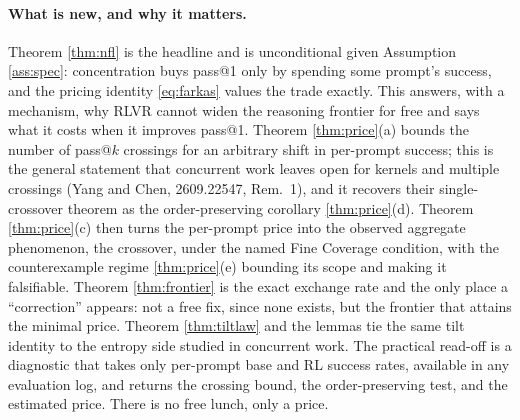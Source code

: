 \paragraph{What is new, and why it matters.}
Theorem \ref{thm:nfl} is the headline and is unconditional given Assumption
\ref{ass:spec}: concentration buys pass@1 only by spending some prompt's
success, and the pricing identity \eqref{eq:farkas} values the trade exactly.
This answers, with a mechanism, why RLVR cannot widen the reasoning frontier
for free and says what it costs when it improves pass@1. Theorem
\ref{thm:price}(a) bounds the number of pass@$k$ crossings for an arbitrary
shift in per-prompt success; this is the general statement that concurrent work
leaves open for kernels and multiple crossings (Yang and Chen, 2609.22547,
Rem.~1), and it recovers their single-crossover theorem as the order-preserving
corollary \ref{thm:price}(d). Theorem \ref{thm:price}(c) then turns the
per-prompt price into the observed aggregate phenomenon, the crossover, under
the named Fine Coverage condition, with the counterexample regime
\ref{thm:price}(e) bounding its scope and making it falsifiable. Theorem
\ref{thm:frontier} is the exact exchange rate and the only place a
``correction'' appears: not a free fix, since none exists, but the frontier that
attains the minimal price. Theorem \ref{thm:tiltlaw} and the lemmas tie the same
tilt identity to the entropy side studied in concurrent work. The practical
read-off is a diagnostic that takes only per-prompt base and RL success rates,
available in any evaluation log, and returns the crossing bound, the
order-preserving test, and the estimated price. There is no free lunch, only a
price.